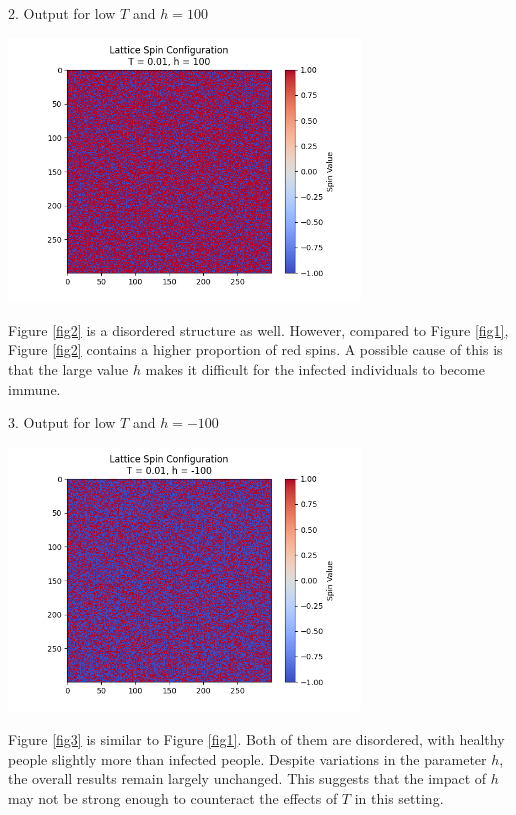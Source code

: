 \documentclass[11pt]{book}
\begin{document}
2. Output for low $T$ and $h=100$
\begin{center}
\captionsetup{type=figure}
    \includegraphics[width=0.7\textwidth]{nn, T=0.01, h=100.png}
    \label{fig2}
\end{center}
Figure \eqref{fig2} is a disordered structure as well. However, compared to Figure \eqref{fig1}, Figure \eqref{fig2} contains a higher proportion of red spins. A possible cause of this is that the large value $h$ makes it difficult for the infected individuals to become immune.

3. Output for low $T$ and $h=-100$
\begin{center}
\captionsetup{type=figure}
    \includegraphics[width=0.7\textwidth]{nn, T=0.01, h=-100.png}
    \label{fig3}
\end{center}
Figure \eqref{fig3} is similar to Figure \eqref{fig1}. Both of them are disordered, with healthy people slightly more than infected people. Despite variations in the parameter $h$, the overall results remain largely unchanged. This suggests that the impact of $h$ may not be strong enough to counteract the effects of $T$ in this setting.
\end{document}
